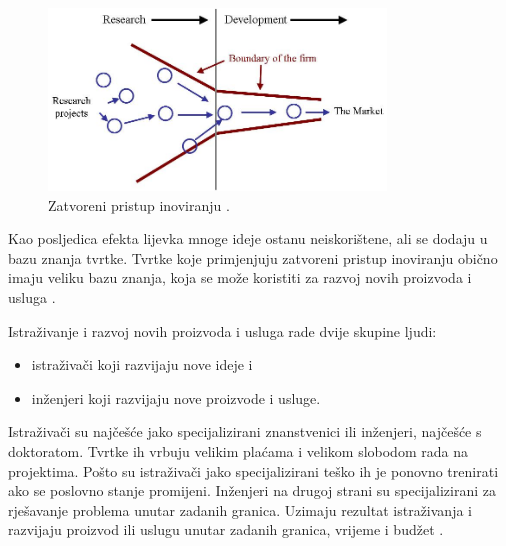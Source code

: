 \begin{figure} 
    \centering
    \includegraphics[width=0.8\textwidth]{images/closed_inovations_funnel.jpg}
    \caption{Zatvoreni pristup inoviranju \citep{openinnovation2016}.}\label{fig:closed_inovations_funnel}
\end{figure}

Kao posljedica efekta lijevka mnoge ideje ostanu neiskorištene, ali se dodaju u
bazu znanja tvrtke. Tvrtke koje primjenjuju zatvoreni pristup inoviranju obično
imaju veliku bazu znanja, koja se može koristiti za razvoj novih proizvoda i
usluga \citep{zatvorenaotvorena2020,openinnovation2003}.

Istraživanje i razvoj novih proizvoda i usluga rade dvije skupine ljudi:
\begin{itemize}
    \item istraživači koji razvijaju nove ideje i
    \item inženjeri koji razvijaju nove proizvode i usluge.
\end{itemize}
Istraživači su najčešće jako specijalizirani znanstvenici ili inženjeri,
najčešće s doktoratom. Tvrtke ih vrbuju velikim plaćama i velikom slobodom rada
na projektima. Pošto su istraživači jako specijalizirani teško ih je ponovno
trenirati ako se poslovno stanje promijeni. Inženjeri na drugoj strani su
specijalizirani za rješavanje problema unutar zadanih granica. Uzimaju rezultat
istraživanja i razvijaju proizvod ili uslugu unutar zadanih granica, vrijeme i
budžet \citep{openinnovation2003}.